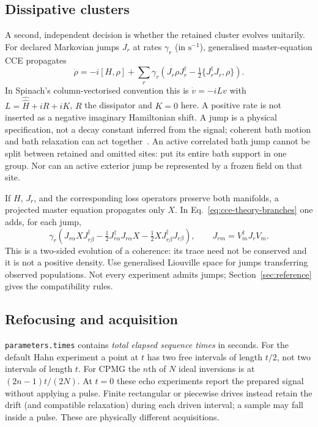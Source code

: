 \documentclass[11pt,a4paper]{article}
\newcommand{\code}[1]{\texttt{#1}}
\newcommand{\sop}[1]{\hat{\hat{#1}}}
\begin{document}
\subsection{Dissipative clusters}

A second, independent decision is whether the retained cluster evolves
unitarily. For declared Markovian jumps $J_r$ at rates $\gamma_r$
(in $\mathrm{s}^{-1}$), generalised master-equation CCE propagates
\begin{equation}
 \dot\rho=-i[H,\rho]+\sum_r\gamma_r\!\left(
 J_r\rho J_r^\dagger-\tfrac12\{J_r^\dagger J_r,\rho\}\right).
 \label{eq:cce-theory-lindblad}
\end{equation}
In Spinach's column-vectorised convention this is $\dot v=-iLv$ with
$L=\sop H+iR+iK$, $R$ the dissipator and $K=0$ here. A positive rate is
not inserted as a negative imaginary Hamiltonian shift. A jump is a
physical specification, not a decay constant inferred from the signal;
coherent bath motion and bath relaxation can act together~\cite{cce-theory-onizhuk24}.
An active correlated bath jump cannot be split between retained and
omitted sites: put its entire bath support in one group. Nor can an active exterior
jump be represented by a frozen field on that site.

If $H$, $J_r$, and the corresponding loss operators preserve both
manifolds, a projected master equation propagates only $X$. In
Eq.~\eqref{eq:cce-theory-branches} one adds, for each jump,
\begin{equation}
 \gamma_r\left(J_{r\alpha}XJ_{r\beta}^{\dagger}
 -\tfrac12 J_{r\alpha}^{\dagger}J_{r\alpha}X
 -\tfrac12 X J_{r\beta}^{\dagger}J_{r\beta}\right),\qquad
 J_{rm}=V_m^\dagger J_rV_m.
 \label{eq:cce-theory-proj-jump}
\end{equation}
This is a two-sided evolution of a coherence: its trace need not be
conserved and it is not a positive density. Use generalised Liouville
space for jumps transferring observed populations. Not every experiment
admits jumps; Section~\ref{sec:reference} gives the compatibility rules.

\subsection{Refocusing and acquisition}

\code{parameters.times} contains \emph{total elapsed sequence times} in
seconds. For the default Hahn experiment a point at $t$ has two free
intervals of length $t/2$, not two intervals of length $t$. For CPMG the
$n$th of $N$ ideal inversions is at $(2n-1)t/(2N)$. At $t=0$ these echo
experiments report the prepared signal without applying a pulse. Finite
rectangular or piecewise drives instead retain the drift (and compatible
relaxation) during each driven interval; a sample may fall inside a
pulse. These are physically different acquisitions.
\end{document}
